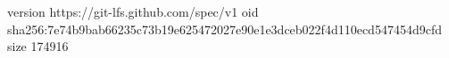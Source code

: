 version https://git-lfs.github.com/spec/v1
oid sha256:7e74b9bab66235c73b19e625472027e90e1e3dceb022f4d110ecd547454d9cfd
size 174916
